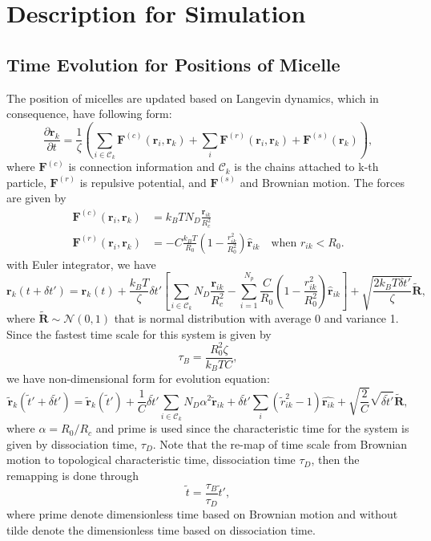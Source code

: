 \documentclass[10pt, a4paper]{article}
\begin{document}
\section{Description for Simulation}
\subsection{Time Evolution for Positions of Micelle}
The position of micelles are updated based on Langevin dynamics, which in consequence, have following form:
\begin{equation}
\frac{\partial \mathbf{r}_k}{\partial t} = \frac{1}{\zeta}\left(\sum_{i\in\mathscr{C}_k} \mathbf{F}^{(c)}(\mathbf{r}_i, \mathbf{r}_k) + \sum_i \mathbf{F}^{(r)}(\mathbf{r}_i, \mathbf{r}_k) + \mathbf{F}^{(s)}(\mathbf{r}_k)\right),
\end{equation}
where $\mathbf{F}^{(c)}$ is connection information and $\mathscr{C}_k$ is the chains attached to k-th particle, $\mathbf{F}^{(r)}$ is repulsive potential, and $\mathbf{F}^{(s)}$ and Brownian motion. The forces are given by
\begin{align}
\mathbf{F}^{(c)}(\mathbf{r}_i, \mathbf{r}_k) &= k_BTN_D\frac{\mathbf{r}_{ik}}{R_c^2} \\
\mathbf{F}^{(r)}(\mathbf{r}_i, \mathbf{r}_k) &= -C\frac{k_BT}{R_0}\left(1 - \frac{r_{ik}^2}{R_0^2}\right)\hat{\mathbf{r}}_{ik} \quad\textrm{when $r_{ik} < R_0$}.
\end{align}
with Euler integrator, we have
\begin{equation}
\mathbf{r}_k(t + \delta t') = \mathbf{r}_k(t) + \frac{k_BT}{\zeta}\delta t'\left[\sum_{i\in \mathscr{C}_k}N_D\frac{\mathbf{r}_{ik}}{R_c^2} - \sum_{i=1}^{N_p} \frac{C}{R_0}\left(1 - \frac{r_{ik}^2}{R_0^2}\right)\hat{\mathbf{r}}_{ik}\right] + \sqrt{\frac{2 k_BT \delta t'}{\zeta}}\tilde{\mathbf{R}},
\end{equation}
where $\tilde{\mathbf{R}}\sim \mathscr{N}(0, 1)$ that is normal distribution with average 0 and variance 1.
Since the fastest time scale for this system is given by
\begin{equation}
\tau_B = \frac{R_0^2\zeta}{k_BTC},
\end{equation}
we have non-dimensional form for evolution equation:
\begin{equation}
\tilde{\mathbf{r}}_k(\tilde{t}' + \delta \tilde{t}') = \tilde{\mathbf{r}}_k(\tilde{t}') + \frac{1}{C}\delta\tilde{t}'\sum_{i\in\mathscr{C}_k} N_D\alpha^2\tilde{\mathbf{r}}_{ik} + \delta\tilde{t}'  \sum_{i} (\tilde{r}_{ik}^2 - 1)\hat{\mathbf{r}_{ik}} + \sqrt{\frac{2}{C}}\sqrt{\delta \tilde{t}'}\tilde{\mathbf{R}},
\end{equation}
where $\alpha = R_0/R_c$ and prime is used since the characteristic time for the system is given by dissociation time, $\tau_D$. 
Note that the re-map of time scale from Brownian motion to topological characteristic time, dissociation time $\tau_D$, then the remapping is done through
\begin{equation}
\tilde{t} = \frac{\tau_B}{\tau_D}\tilde{t}',
\end{equation}
where prime denote dimensionless time based on Brownian motion and without tilde denote the dimensionless time based on dissociation time.
\end{document}
